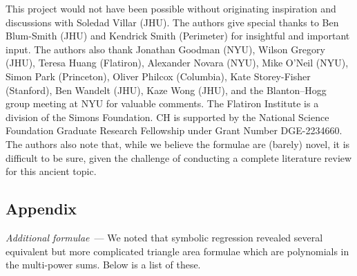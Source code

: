 \documentclass[10pt]{article}
\renewcommand{\paragraph}[1]{\par\addvspace{1em}\noindent\textsl{#1}~---}
\newcommand{\secbreak}{\bigskip{\centering\footnotesize%
\rotatebox[origin=c]{55}{$\triangle$}~~~%
\rotatebox[origin=c]{35}{$\triangle$}~~~%
\rotatebox[origin=c]{15}{$\triangle$}\par}\bigskip\noindent}
\begin{document}
{\footnotesize\par\bigskip\noindent
This project would not have been possible without originating inspiration and discussions with Soledad Villar (JHU).
The authors give special thanks to Ben Blum-Smith (JHU) and Kendrick Smith (Perimeter) for insightful and important input.
The authors also thank
  Jonathan Goodman (NYU),
  Wilson Gregory (JHU),
  Teresa Huang (Flatiron),
  Alexander Novara (NYU),
  Mike O'Neil (NYU),
  Simon Park (Princeton),
  Oliver Philcox (Columbia),
  Kate Storey-Fisher (Stanford),
  Ben Wandelt (JHU),
  Kaze Wong (JHU),
and the Blanton--Hogg group meeting at NYU for valuable comments.
The Flatiron Institute is a division of the Simons Foundation.
CH is supported by the National Science Foundation Graduate Research Fellowship under Grant Number DGE-2234660.
The authors also note that, while we believe the formulae are (barely) novel, it is difficult to be sure, given the challenge of conducting a complete literature review for this ancient topic.\par}

\secbreak

\vspace{-\bigskipamount}
\renewcommand{\section}[2]{}%
{\small\singlespacing\par}

\secbreak
\appendix
\subsection{Appendix}
\label{sec:appendix}

\paragraph{Additional formulae} We noted that symbolic regression revealed several equivalent but more complicated triangle area formulae which are polynomials in the multi-power sums. Below is a list of these.
\end{document}

